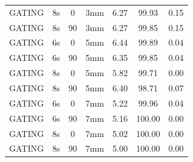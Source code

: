 \documentclass[type=dr, dr=rernat, accentcolor=tud7b,colorbacktitle, bigchapter, openright, twoside, 12pt ]{tudthesis}
\begin{document}
\begin{table}[H]
\begin{tabular}{|c||c|c|c||c|c|c|}
GATING & 8s & 0 & 3mm & 6.27 & 99.93 & 0.15 \\
GATING & 8s & 90 & 3mm & 6.27 & 99.85 & 0.15 \\
GATING & 6s & 0 & 5mm & 6.44 & 99.89 & 0.04 \\
GATING & 6s & 90 & 5mm & 6.35 & 99.85 & 0.04 \\
GATING & 8s & 0 & 5mm & 5.82 & 99.71 & 0.00 \\
GATING & 8s & 90 & 5mm & 6.40 & 98.71 & 0.07 \\
GATING & 6s & 0 & 7mm & 5.22 & 99.96 & 0.04 \\
GATING & 6s & 90 & 7mm & 5.16 & 100.00 & 0.00 \\
GATING & 8s & 0 & 7mm & 5.02 & 100.00 & 0.00 \\
GATING & 8s & 90 & 7mm & 5.00 & 100.00 & 0.00 \\
    \hline\hline 
  \end{tabular}
\end{table}

\newpage
\end{document}
